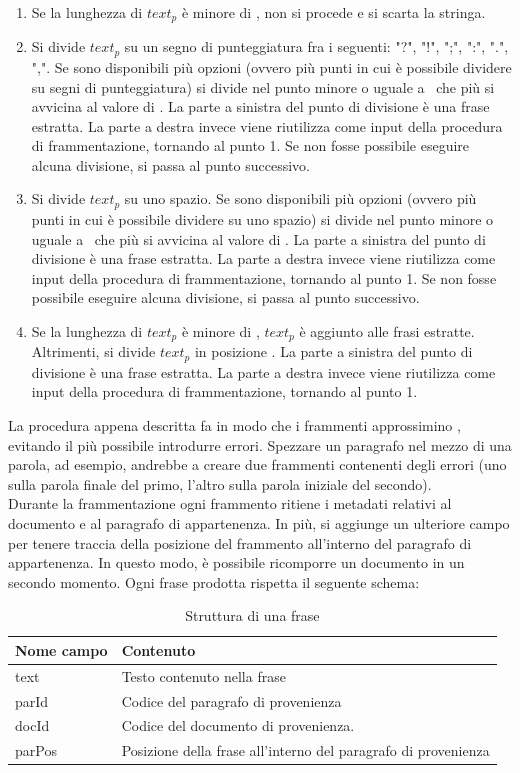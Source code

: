\begin{enumerate}
\item Se la lunghezza di $text_p$ è minore di \lmin, non si procede e si scarta la stringa.
\item Si divide $text_p$ su un segno di punteggiatura fra i seguenti: "?", "!", ";", ":", ".", ",". Se sono disponibili più opzioni (ovvero più punti in cui è possibile dividere su segni di punteggiatura) si divide nel punto minore o uguale a \lmax\ che più si avvicina al valore di \lmax. La parte a sinistra del punto di divisione è una frase estratta. La parte a destra invece viene riutilizza come input della procedura di frammentazione, tornando al punto 1. Se non fosse possibile eseguire alcuna divisione, si passa al punto successivo.
\item Si divide $text_p$ su uno spazio. Se sono disponibili più opzioni (ovvero più punti in cui è possibile dividere su uno spazio) si divide nel punto minore o uguale a \lmax\ che più si avvicina al valore di \lmax. La parte a sinistra del punto di divisione è una frase estratta. La parte a destra invece viene riutilizza come input della procedura di frammentazione, tornando al punto 1. Se non fosse possibile eseguire alcuna divisione, si passa al punto successivo.
\item Se la lunghezza di $text_p$ è minore di \lmax, $text_p$ è aggiunto alle frasi estratte. Altrimenti, si divide $text_p$ in posizione \lmax. La parte a sinistra del punto di divisione è una frase estratta. La parte a destra invece viene riutilizza come input della procedura di frammentazione, tornando al punto 1. 
\end{enumerate}

La procedura appena descritta fa in modo che i frammenti approssimino  \lmax, evitando il più possibile introdurre errori. Spezzare un paragrafo nel mezzo di una parola, ad esempio, andrebbe a creare due frammenti contenenti degli errori (uno sulla parola finale del primo, l'altro sulla parola iniziale del secondo).\\
Durante la frammentazione ogni frammento ritiene i metadati relativi al documento e al paragrafo di appartenenza. In più, si aggiunge un ulteriore campo per tenere traccia della posizione del frammento all'interno del paragrafo di appartenenza. In questo modo, è possibile ricomporre un documento in un secondo momento. Ogni frase prodotta rispetta il seguente schema:
\begin{table}[H]
\centering
\begin{tabular}{ll}
\textbf{Nome campo} & \textbf{Contenuto} \\ \hline
text  & Testo contenuto nella frase\\
parId & Codice del paragrafo di provenienza \\
docId & Codice del documento di provenienza.\\
parPos & Posizione della frase all'interno del paragrafo di provenienza\\
\end{tabular}
\caption{Struttura di una frase}
\label{tab:dst_frasestrut}
\end{table}

